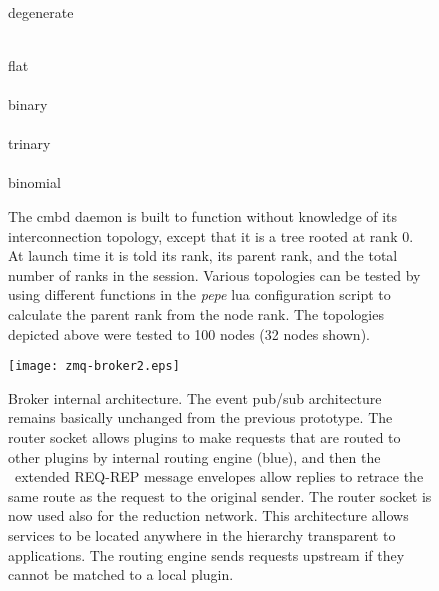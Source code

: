 \begin{figure}
\begin{minipage}[b]{0.10\linewidth}
  \centering
  \\
  degenerate
\end{minipage}
\hspace{0.5cm}
\begin{minipage}[b]{0.80\linewidth}
  \centering
  \\ flat\\
  \vspace{0.5cm}
  \\ binary\\
  \vspace{0.5cm}
  \\ trinary\\
  \vspace{0.5cm}
  \\ binomial\\
\end{minipage}

\caption{The cmbd daemon is built to function without knowledge of its
interconnection topology, except that it is a tree rooted at rank 0.
At launch time it is told its rank, its parent rank, and the total number
of ranks in the session.
Various topologies can be tested by using different functions in the
{\em pepe} lua configuration script to calculate the parent rank from
the node rank.
The topologies depicted above were tested to 100 nodes (32 nodes shown).}
\label{fig:treetop}
\end{figure}


\begin{figure}
\centering
\texttt{[image: zmq-broker2.eps]}
\caption{Broker internal architecture.
The event pub/sub architecture remains basically unchanged from the
previous prototype.  The router socket allows plugins to make requests
that are routed to other plugins by internal routing engine (blue),
and then the \zMQ\ extended REQ-REP message envelopes allow replies
to retrace the same route as the request to the original sender.
The router socket is now used also for the reduction network.  This
architecture allows services to be located anywhere in the hierarchy
transparent to applications.  The routing engine sends requests upstream
if they cannot be matched to a local plugin.}
\label{fig:cmbint2}
\end{figure}

